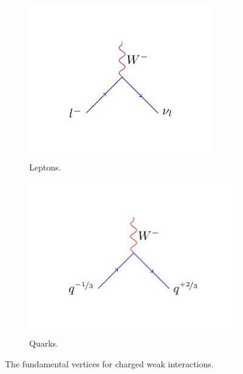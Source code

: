 \begin{figure}[htbp]
  \centering
  \begin{subfigure}{0.45\textwidth}
    \centering
    \includegraphics[width=\textwidth]{weak_charged_lepton_process}
    \caption{Leptons.}
    \label{fig:weak_charged_lepton_process}
  \end{subfigure}
  \begin{subfigure}{0.45\textwidth}
    \centering
    \includegraphics[width=\textwidth]{weak_charged_quark_process}
    \caption{Quarks.}
    \label{fig:weak_charged_quark_process}
  \end{subfigure}
  \caption{The fundamental vertices for charged weak interactions.}
  \label{fig:weak_charged}
\end{figure}

